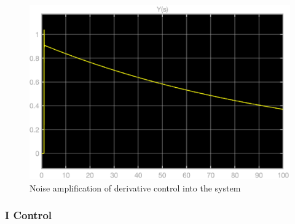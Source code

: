 \begin{figure}[h!]
	\centering
	\includegraphics[width=\linewidth]{Bilder/NoiseAmplification_DerivativeControl.eps}
	\caption{Noise amplification of derivative control into the system}
	\label{Fig_Noiseamplification_DerivativeControl}
\end{figure}

\subsubsection{I Control}

